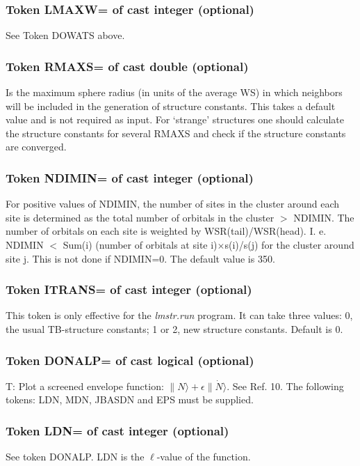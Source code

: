 \documentclass[aps,twocolumn,a4]{revtex4}
\begin{document}
\subsubsection{Token LMAXW= of cast integer (optional)}
See Token DOWATS above.

\subsubsection{Token RMAXS= of cast double (optional)}
Is the maximum sphere radius (in units of the average WS)
in which neighbors will be included in the generation of structure
constants.  This takes a default value and is not required as input.
For `strange' structures one should calculate the structure constants
for several RMAXS and check if the structure constants are converged.

\subsubsection{Token NDIMIN= of cast integer (optional)}
For positive values of
NDIMIN, the number of sites in the cluster around each site is
determined as the total number of orbitals in the cluster $>$ NDIMIN.
The number of orbitals on each site is weighted by WSR(tail)/WSR(head).
I. e. NDIMIN $<$ Sum(i) (number of orbitals at site i)$\times $s(i)/s(j)
for the cluster around site j. 
This is not done if NDIMIN=0. The default value is 350.

\subsubsection{Token ITRANS= of cast integer (optional)}
This token is only effective for the {\em lmstr.run} program. It can
take three values: 0, the usual TB-structure constants; 1 or 2,
new structure constants. Default is 0.

\subsubsection{Token DONALP= of cast logical (optional)}
T: Plot a screened envelope function: $\| N\rangle + \epsilon
\| \dot N\rangle$. See Ref. 10. The following tokens:
LDN, MDN, JBASDN and EPS must be supplied.

\subsubsection{Token LDN= of cast integer (optional)}
See token DONALP. LDN is the $\ell $-value of the function.
\end{document}
